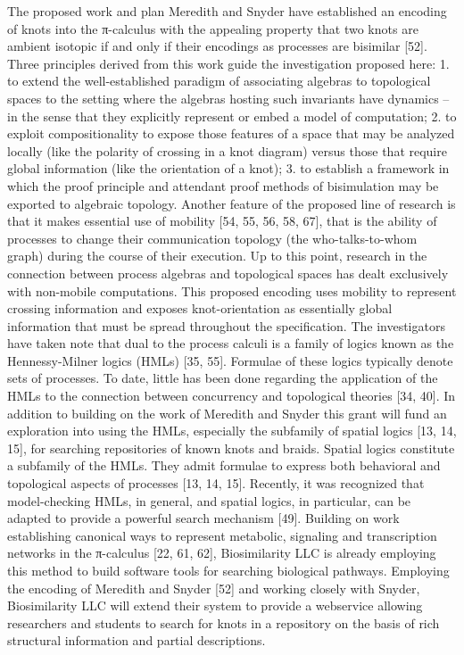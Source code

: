 \documentclass[12pt]{amsart}
\begin{document}
The proposed work and plan
Meredith and Snyder have established an encoding of knots into the π-calculus with the appealing property that two knots are ambient isotopic if and only if their encodings as processes are bisimilar [52]. Three principles derived from this work guide the investigation proposed here:
1. to extend the well-established paradigm of associating algebras to topological spaces to the setting where the algebras hosting such invariants have dynamics –  in the sense that they explicitly represent or embed a model of computation;
2. to exploit compositionality to expose those features of a space that may be analyzed locally (like the polarity of crossing in a knot diagram) versus those that require global information (like the orientation of a knot);
3. to establish a framework in which the proof principle and attendant proof methods of bisimulation may be exported to algebraic topology.
Another feature of the proposed line of research is that it makes essential use of mobility [54, 55, 56, 58, 67], that is the ability of processes to change their communication topology (the who-talks-to-whom graph) during the course of their execution. Up to this point, research in the connection between process algebras and topological spaces has dealt exclusively with non-mobile computations. This proposed encoding uses mobility to represent crossing information and exposes knot-orientation as essentially global information that must be spread throughout the specification.
The investigators have taken note that dual to the process calculi is a family of logics known as the Hennessy-Milner logics (HMLs) [35, 55]. Formulae of these logics typically denote sets of processes. To date, little has been done regarding the application of the HMLs to the connection between concurrency and topological theories [34, 40]. In addition to building on the work of Meredith and Snyder this grant will fund an exploration into using the HMLs, especially the subfamily of spatial logics [13, 14, 15], for searching repositories of known knots and braids. 
Spatial logics constitute a subfamily of the HMLs. They admit formulae to express both behavioral and topological aspects of processes [13, 14, 15]. Recently, it was recognized that model-checking HMLs, in general, and spatial logics, in particular, can be adapted to provide a powerful search mechanism [49].  Building on work establishing canonical ways to represent metabolic, signaling and transcription networks in the π-calculus [22, 61, 62], Biosimilarity LLC is already employing this method to build software tools for searching biological pathways. Employing the encoding of Meredith and Snyder [52] and working closely with Snyder, Biosimilarity LLC will extend their system to provide a webservice allowing researchers and students to search for knots in a repository on the basis of rich structural information and partial descriptions.
\end{document}
